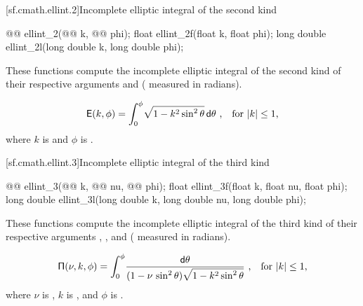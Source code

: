 [sf.cmath.ellint.2]{Incomplete elliptic integral of the second kind}%
%
%
%
%
%
\begin{itemdecl}
@@ ellint_2(@@ k, @@ phi);
float        ellint_2f(float k, float phi);
long double  ellint_2l(long double k, long double phi);
\end{itemdecl}

\begin{itemdescr}
\pnum
\effects
These functions compute
the incomplete elliptic integral of the second kind
of their respective arguments
 and  ( measured in radians).

\pnum
\returns
\[ \mathsf{E}(k, \phi) = \int_0^\phi \! \sqrt{1 - k^2 \sin^2 \theta} \, \mathsf{d}\theta
   \text{ ,\quad for $|k| \le 1$,} \]
where
$k$ is  and
$\phi$ is .
\end{itemdescr}

[sf.cmath.ellint.3]{Incomplete elliptic integral of the third kind}%
%
%
%
%
%
\begin{itemdecl}
@@ ellint_3(@@ k, @@ nu,
                             @@ phi);
float        ellint_3f(float k, float nu, float phi);
long double  ellint_3l(long double k, long double nu, long double phi);
\end{itemdecl}

\begin{itemdescr}

\pnum
\effects
These functions compute
the incomplete elliptic integral of the third kind
of their respective arguments
, , and  ( measured in radians).

\pnum
\returns
\[ \mathsf{\Pi}(\nu, k, \phi) = \int_0^\phi \!
   \frac{ \mathsf{d}\theta }{ (1 - \nu \, \sin^2 \theta) \sqrt{1 - k^2 \sin^2 \theta} } \text{ ,\quad for $|k| \le 1$,} \]
where
$\nu$ is ,
$k$ is , and
$\phi$ is .
\end{itemdescr}

